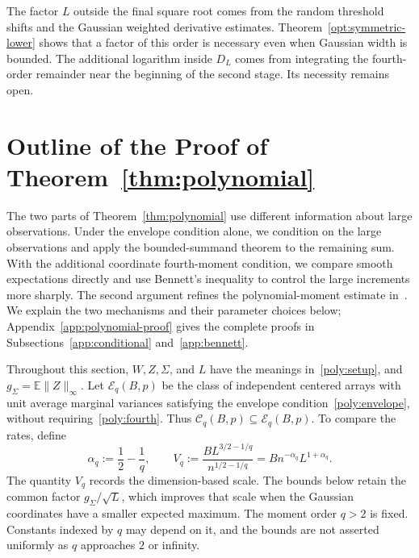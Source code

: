 \documentclass[11pt,letterpaper]{article}
\newenvironment{vSixBlock}{\color{magenta}}{}
\theoremstyle{remark}
\newcommand{\E}{\mathbb E}
\begin{document}
\begin{vSixBlock}
The factor \(L\) outside the final square root comes from the
random threshold shifts and the Gaussian weighted derivative estimates.
Theorem~\ref{opt:symmetric-lower} shows that a factor of this order
is necessary even when Gaussian width is bounded. The additional
logarithm inside \(D_L\) comes from integrating the fourth-order
remainder near the beginning of the second stage. Its necessity
remains open.
\end{vSixBlock}

\section{Outline of the Proof of Theorem~\ref*{thm:polynomial}}\label{sec:poly}

The two parts of Theorem~\ref{thm:polynomial} use different information
about large observations. Under the envelope condition alone, we
condition on the large observations and apply the bounded-summand
theorem to the remaining sum. With the additional coordinate
fourth-moment condition, we compare smooth expectations directly and
use Bennett's inequality to control the large increments more sharply.
The second argument refines the polynomial-moment estimate
in~\cite{CCKK2022}. We explain the two mechanisms and their parameter
choices below; Appendix~\ref{app:polynomial-proof} gives the complete
proofs in Subsections~\ref{app:conditional} and~\ref{app:bennett}.

Throughout this section, $W,Z,\Sigma$, and $L$ have the meanings
in~\eqref{poly:setup}, and $g_\Sigma=\E\|Z\|_\infty$.
Let $\mathcal E_q(B,p)$ be the class of independent centered arrays
with unit average marginal variances satisfying the envelope
condition~\eqref{poly:envelope}, without requiring~\eqref{poly:fourth}.
Thus $\mathcal C_q(B,p)\subseteq\mathcal E_q(B,p)$.
To compare the rates, define
\begin{equation}
 \alpha_q:=\frac12-\frac1q,\qquad
 V_q:=\frac{B L^{3/2-1/q}}{n^{1/2-1/q}}
      =Bn^{-\alpha_q}L^{1+\alpha_q}.
 \label{poly:rates}
\end{equation}
The quantity $V_q$ records the dimension-based scale. The bounds
below retain the common factor $g_\Sigma/\sqrt L$, which improves
that scale when the Gaussian coordinates have a smaller expected
maximum. The moment order $q>2$ is fixed. Constants indexed by $q$
may depend on it, and the bounds are not asserted uniformly as $q$
approaches $2$ or infinity.
\end{document}
